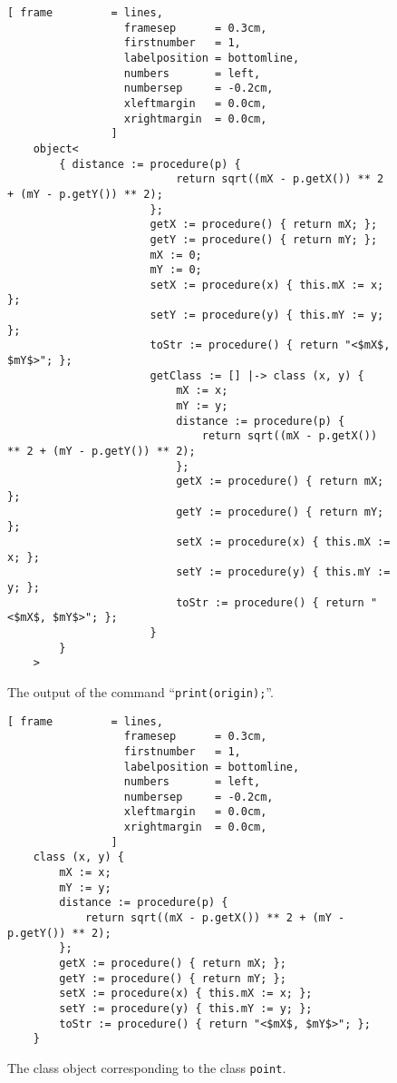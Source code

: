 \begin{figure}[!ht]
\centering
\begin{Verbatim}[ frame         = lines, 
                  framesep      = 0.3cm, 
                  firstnumber   = 1,
                  labelposition = bottomline,
                  numbers       = left,
                  numbersep     = -0.2cm,
                  xleftmargin   = 0.0cm,
                  xrightmargin  = 0.0cm,
                ]
    object<
        { distance := procedure(p) { 
                          return sqrt((mX - p.getX()) ** 2 + (mY - p.getY()) ** 2); 
                      }; 
                      getX := procedure() { return mX; }; 
                      getY := procedure() { return mY; }; 
                      mX := 0; 
                      mY := 0; 
                      setX := procedure(x) { this.mX := x; }; 
                      setY := procedure(y) { this.mY := y; }; 
                      toStr := procedure() { return "<$mX$, $mY$>"; }; 
                      getClass := [] |-> class (x, y) { 
                          mX := x; 
                          mY := y; 
                          distance := procedure(p) { 
                              return sqrt((mX - p.getX()) ** 2 + (mY - p.getY()) ** 2); 
                          }; 
                          getX := procedure() { return mX; }; 
                          getY := procedure() { return mY; }; 
                          setX := procedure(x) { this.mX := x; }; 
                          setY := procedure(y) { this.mY := y; }; 
                          toStr := procedure() { return "<$mX$, $mY$>"; }; 
                      }
        }
    >
\end{Verbatim}
\vspace*{-0.3cm}
\caption{The output of the command ``\texttt{print(origin);}''.}
\label{fig:print_origin}
\end{figure}

\begin{figure}[!ht]
\centering
\begin{Verbatim}[ frame         = lines, 
                  framesep      = 0.3cm, 
                  firstnumber   = 1,
                  labelposition = bottomline,
                  numbers       = left,
                  numbersep     = -0.2cm,
                  xleftmargin   = 0.0cm,
                  xrightmargin  = 0.0cm,
                ]
    class (x, y) { 
        mX := x; 
        mY := y; 
        distance := procedure(p) { 
            return sqrt((mX - p.getX()) ** 2 + (mY - p.getY()) ** 2); 
        }; 
        getX := procedure() { return mX; }; 
        getY := procedure() { return mY; }; 
        setX := procedure(x) { this.mX := x; }; 
        setY := procedure(y) { this.mY := y; }; 
        toStr := procedure() { return "<$mX$, $mY$>"; }; 
    }
\end{Verbatim}
\vspace*{-0.3cm}
\caption{The class object corresponding to the class \texttt{point}.}
\label{fig:point-class}
\end{figure}

